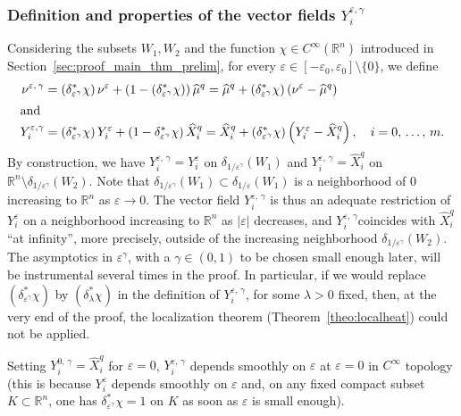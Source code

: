 \documentclass[AHL,Unicode,published]{cedram}
\newcommand*\R{\mathbb{R}}
\begin{document}
\subsubsection{Definition and properties of the vector fields \texorpdfstring{$Y_i^{\varepsilon,\gamma}$}{Yi varepsilon, gamma}}\label{sec_defYiepsgam}
Considering the subsets $W_1,W_2$ and the function $\chi\in C^\infty(\R^n)$ introduced in Section~\ref{sec:proof_main_thm_prelim}, for every $\varepsilon\in[-\varepsilon_0,\varepsilon_0]\setminus\{0\}$, we define
\begin{align*}
\nu^{\varepsilon,\,\gamma} &= \left(\delta_{\varepsilon^\gamma}^*\chi\right) \nu^\varepsilon + \left(1-\left(\delta_{\varepsilon^\gamma}^*\chi\right)\right)\widehat{\mu}^{q} = \widehat{\mu}^{q} + \left(\delta_{\varepsilon^\gamma}^*\chi\right) \left(\nu^\varepsilon - \widehat{\mu}^{q}\right)
\\
\intertext{and}
Y_i^{\varepsilon,\gamma} &= \left(\delta_{\varepsilon^\gamma}^*\chi\right) Y_i^\varepsilon + \left(1-\delta_{\varepsilon^\gamma}^*\chi\right)\widehat{X}_i^{q} = \widehat{X}_i^{q} + \left(\delta_{\varepsilon^\gamma}^*\chi\right) \left(Y_i^\varepsilon-\widehat{X}_i^{q}\right), \quad i=0,\,\ldots,\,m.
\end{align*}
By construction, we have $Y_i^{\varepsilon,\,\gamma} = Y_i^\varepsilon$ on $\delta_{1/\varepsilon^\gamma}(W_1)$ and $Y_i^{\varepsilon,\,\gamma} = \widehat{X}_i^{q}$ on $\R^n\setminus\delta_{1/\varepsilon^\gamma}(W_2)$. Note that $\delta_{1/\varepsilon^\gamma}(W_1)\subset \delta_{1/\varepsilon}(W_1)$ is a neighborhood of $0$ increasing to $\R^n$ as $\varepsilon\rightarrow 0$. The vector field $Y_i^{\varepsilon,\,\gamma}$ is thus an adequate restriction of $Y_i^\varepsilon$ on a neighborhood increasing to $\R^n$ as $\vert\varepsilon\vert$ decreases, and $Y_i^{\varepsilon,\,\gamma}$coincides with $\widehat{X}_i^{q}$ ``at infinity'', more precisely, outside of the increasing neighborhood $\delta_{1/\varepsilon^\gamma}(W_2)$. The asymptotics in $\varepsilon^\gamma$, with a $\gamma\in(0,1)$ to be chosen small enough later, will be instrumental several times in the proof. In particular, if we would replace $(\delta_{\varepsilon^\gamma}^*\chi)$ by $(\delta_\lambda^*\chi)$ in the definition of $Y_i^{\varepsilon,\,\gamma}$, for some $\lambda>0$ fixed, then, at the very end of the proof, the localization theorem (Theorem~\ref{theo:localheat}) could not be applied.

Setting $Y_i^{0,\,\gamma}= \widehat{X}_i^{q}$ for $\varepsilon=0$, $Y_i^{\varepsilon,\,\gamma}$ depends smoothly on $\varepsilon$ at $\varepsilon=0$ in $C^\infty$ topology (this is because $Y_i^\varepsilon$ depends smoothly on $\varepsilon$ and, on any fixed compact subset $K\subset\R^n$, one has $\delta_{\varepsilon^\gamma}^*\chi=1$ on $K$ as soon as $\varepsilon$ is small enough).
\end{document}
